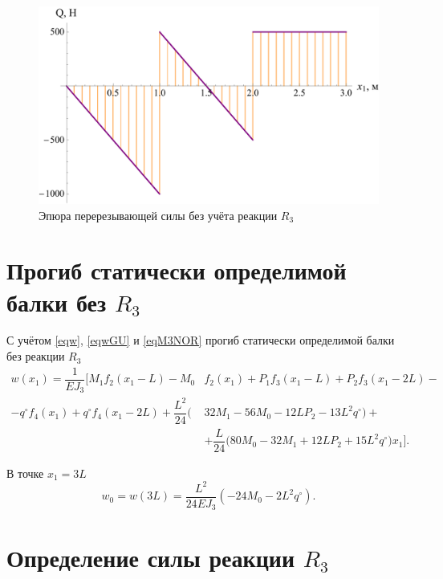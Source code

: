 \documentclass[12pt, a4paper]{article}
\begin{document}
	\begin{figure}[!h]
		\centering
		\includegraphics[width=0.7\linewidth]{plot-9}
		\caption{Эпюра перерезывающей силы без учёта реакции $R_3$}
	\end{figure}
	
	\vspace{-0.75em}
	
	\section{Прогиб статически определимой балки без $R_3$} 
	
	С учётом \eqref{eqw}, \eqref{eqwGU} и \eqref{eqM3NOR} прогиб статически определимой балки без реакции $R_3$
	\begin{equation}
		\begin{split}
			w(x_1) = \dfrac{1}{E J_3} \bigg[ M_1 f_2(x_1 - L) - M_0 & f_2(x_1) + P_1 f_3(x_1 - L) + P_2 f_3(x_1 - 2L) - \\ - q^{\circ} f_4(x_1) + q^{\circ} f_4(x_1 - 2L) + \dfrac{L^2}{24} \big( & 32 M_1 - 56 M_0 - 12L P_2 - 13L^2 q^{\circ} \big) + \\ & + \dfrac{L}{24} \big( 80 M_0 - 32 M_1 + 12L P_2 + 15 L^2 q^{\circ} \big) x_1 \bigg].
		\end{split}
		\label{eqwNOR} 
	\end{equation}
	
	В точке $x_1 = 3L$
	\vspace{-0.5em}
	\begin{equation}
		w_{0} = w(3L) = \dfrac{L^2}{24 E J_3} \left( -24 M_0 - 2 L^2 q^{\circ} \right).
		\label{eqw0}
	\end{equation}
	
	\newpage
	
	\section{Определение силы реакции $R_3$} 
	
\end{document}
